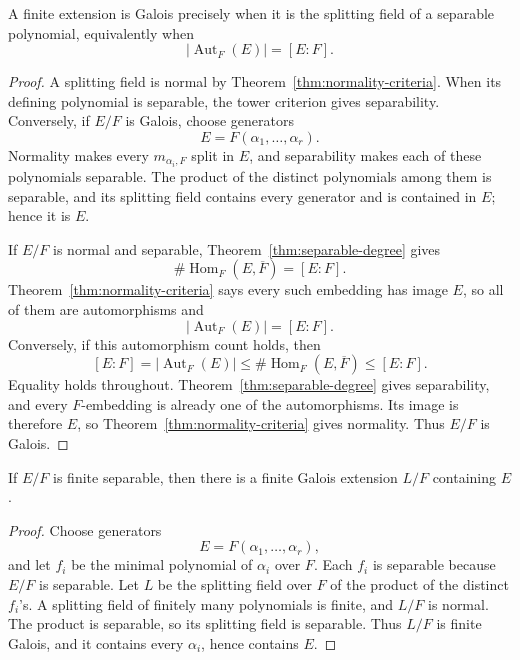 \begin{proposition}\label{prop:finite-galois-criteria}
A finite extension is Galois precisely when it is the splitting field of a
separable polynomial, equivalently when
\[
|\operatorname{Aut}_F(E)|=[E:F].
\]
\end{proposition}
\begin{proof}
A splitting field is normal by Theorem~\ref{thm:normality-criteria}.
When its defining polynomial is separable, the tower criterion gives
separability.
Conversely, if \(E/F\) is Galois, choose generators
\[
E=F(\alpha_1,\ldots,\alpha_r).
\]
Normality makes every \(m_{\alpha_i,F}\) split in \(E\), and separability
makes each of these polynomials separable.  The product of the distinct
polynomials among them is separable, and its splitting field contains every
generator and is contained in \(E\); hence it is \(E\).

If \(E/F\) is normal and separable, Theorem~\ref{thm:separable-degree} gives
\[
\#\operatorname{Hom}_F(E,\overline F)=[E:F].
\]
Theorem~\ref{thm:normality-criteria} says every such embedding has image
\(E\), so all of them are automorphisms and
\[
|\operatorname{Aut}_F(E)|=[E:F].
\]
Conversely, if this automorphism count holds, then
\[
[E:F]
=|\operatorname{Aut}_F(E)|
\leq\#\operatorname{Hom}_F(E,\overline F)
\leq[E:F].
\]
Equality holds throughout.  Theorem~\ref{thm:separable-degree} gives
separability, and every \(F\)-embedding is already one of the automorphisms.
Its image is therefore \(E\), so Theorem~\ref{thm:normality-criteria} gives
normality.  Thus \(E/F\) is Galois.
\end{proof}

\begin{applicationtheorem}
\label{thm:finite-galois-closure}
If \(E/F\) is finite separable, then there is a finite Galois extension
\(L/F\) containing \(E\).
\end{applicationtheorem}
\begin{proof}
Choose generators
\[
E=F(\alpha_1,\ldots,\alpha_r),
\]
and let \(f_i\) be the minimal polynomial of \(\alpha_i\) over \(F\).  Each
\(f_i\) is separable because \(E/F\) is separable.  Let \(L\) be the
splitting field over \(F\) of the product of the distinct \(f_i\)'s.  A
splitting field of finitely many polynomials is finite, and \(L/F\) is
normal.  The product is separable, so its splitting field is separable.
Thus \(L/F\) is finite Galois, and it contains every \(\alpha_i\), hence
contains \(E\).
\end{proof}

